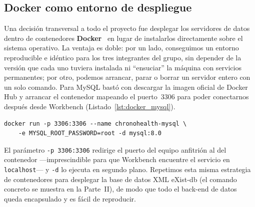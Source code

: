 \documentclass[../main.tex]{subfiles}
\begin{document}
\subsection{Docker como entorno de despliegue}

Una decisión transversal a todo el proyecto fue desplegar los servidores de datos dentro de contenedores \textbf{Docker}~\cite{docker} en lugar de instalarlos directamente sobre el sistema operativo. La ventaja es doble: por un lado, conseguimos un entorno reproducible e idéntico para los tres integrantes del grupo, sin depender de la versión que cada uno tuviera instalada ni \enquote{ensuciar} la máquina con servicios permanentes; por otro, podemos arrancar, parar o borrar un servidor entero con un solo comando. Para MySQL bastó con descargar la imagen oficial de Docker Hub y arrancar el contenedor mapeando el puerto~3306 para poder conectarnos después desde Workbench (Listado~\ref{lst:docker_mysql}).

\begin{lstlisting}[caption={Arranque del servidor MySQL en un contenedor Docker, con el puerto 3306 redirigido para acceder desde Workbench.}, label={lst:docker_mysql}]
docker run -p 3306:3306 --name chronohealth-mysql \
    -e MYSQL_ROOT_PASSWORD=root -d mysql:8.0
\end{lstlisting}

El parámetro \texttt{-p 3306:3306} redirige el puerto del equipo anfitrión al del contenedor ---imprescindible para que Workbench encuentre el servicio en \texttt{localhost}--- y \texttt{-d} lo ejecuta en segundo plano. Repetimos esta misma estrategia de contenedores para desplegar la base de datos XML eXist-db (el comando concreto se muestra en la Parte~II), de modo que todo el back-end de datos queda encapsulado y es fácil de reproducir.
\end{document}
